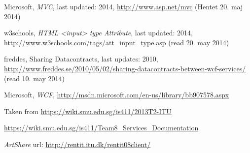 \documentclass[../report.tex]{subfiles}
\begin{document}
\graphicspath{{img/}{../img/}}
\begingroup
\renewcommand{\chapter}[2]{}%
\begin{thebibliography}{}

Microsoft, \textit{MVC}, last updated: 2014, \url{http://www.asp.net/mvc} (Hentet  20. maj 2014)

w3schools, \textit{HTML <input> type Attribute}, last updated: 2014,  \url{http://www.w3schools.com/tags/att\_input\_type.asp} (read 20. may 2014)

freddes, Sharing Datacontracts, last updates: 2010, \url{http://www.freddes.se/2010/05/02/sharing-datacontracts-between-wcf-services/} (read 10. may 2014)

Microsoft, \textit{WCF}, \url{http://msdn.microsoft.com/en-us/library/bb907578.aspx}

Taken from \url{https://wiki.smu.edu.sg/is411/2013T2-ITU}

\url{https://wiki.smu.edu.sg/is411/Team8\_Services\_Documentation}

\textit{ArtShare} url: \url{http://rentit.itu.dk/rentit08client/}

\end{thebibliography}
\endgroup
\end{document}
